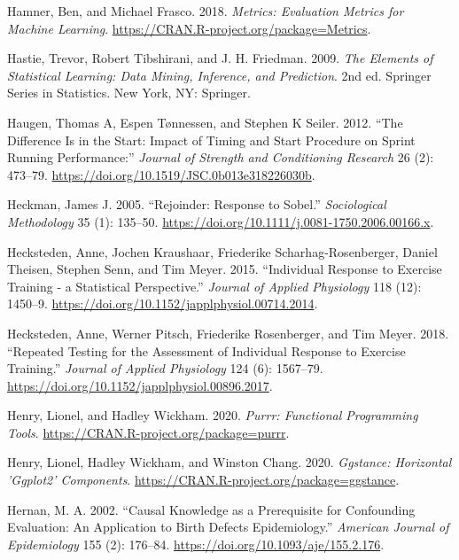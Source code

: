 \documentclass[
]{book}
\newlength{\cslhangindent}
\newenvironment{cslreferences}%
  {\setlength{\parindent}{0pt}%
  \everypar{\setlength{\hangindent}{\cslhangindent}}\ignorespaces}%
  {\par}
\begin{document}
\begin{cslreferences}
\leavevmode\hypertarget{ref-R-Metrics}{}%
Hamner, Ben, and Michael Frasco. 2018. \emph{Metrics: Evaluation Metrics for Machine Learning}. \url{https://CRAN.R-project.org/package=Metrics}.

\leavevmode\hypertarget{ref-hastieElementsStatisticalLearning2009}{}%
Hastie, Trevor, Robert Tibshirani, and J. H. Friedman. 2009. \emph{The Elements of Statistical Learning: Data Mining, Inference, and Prediction}. 2nd ed. Springer Series in Statistics. New York, NY: Springer.

\leavevmode\hypertarget{ref-haugenDifferenceStartImpact2012}{}%
Haugen, Thomas A, Espen Tønnessen, and Stephen K Seiler. 2012. ``The Difference Is in the Start: Impact of Timing and Start Procedure on Sprint Running Performance:'' \emph{Journal of Strength and Conditioning Research} 26 (2): 473--79. \url{https://doi.org/10.1519/JSC.0b013e318226030b}.

\leavevmode\hypertarget{ref-heckmanRejoinderResponseSobel2005}{}%
Heckman, James J. 2005. ``Rejoinder: Response to Sobel.'' \emph{Sociological Methodology} 35 (1): 135--50. \url{https://doi.org/10.1111/j.0081-1750.2006.00166.x}.

\leavevmode\hypertarget{ref-heckstedenIndividualResponseExercise2015}{}%
Hecksteden, Anne, Jochen Kraushaar, Friederike Scharhag-Rosenberger, Daniel Theisen, Stephen Senn, and Tim Meyer. 2015. ``Individual Response to Exercise Training - a Statistical Perspective.'' \emph{Journal of Applied Physiology} 118 (12): 1450--9. \url{https://doi.org/10.1152/japplphysiol.00714.2014}.

\leavevmode\hypertarget{ref-heckstedenRepeatedTestingAssessment2018}{}%
Hecksteden, Anne, Werner Pitsch, Friederike Rosenberger, and Tim Meyer. 2018. ``Repeated Testing for the Assessment of Individual Response to Exercise Training.'' \emph{Journal of Applied Physiology} 124 (6): 1567--79. \url{https://doi.org/10.1152/japplphysiol.00896.2017}.

\leavevmode\hypertarget{ref-R-purrr}{}%
Henry, Lionel, and Hadley Wickham. 2020. \emph{Purrr: Functional Programming Tools}. \url{https://CRAN.R-project.org/package=purrr}.

\leavevmode\hypertarget{ref-R-ggstance}{}%
Henry, Lionel, Hadley Wickham, and Winston Chang. 2020. \emph{Ggstance: Horizontal 'Ggplot2' Components}. \url{https://CRAN.R-project.org/package=ggstance}.

\leavevmode\hypertarget{ref-hernanCausalKnowledgePrerequisite2002}{}%
Hernan, M. A. 2002. ``Causal Knowledge as a Prerequisite for Confounding Evaluation: An Application to Birth Defects Epidemiology.'' \emph{American Journal of Epidemiology} 155 (2): 176--84. \url{https://doi.org/10.1093/aje/155.2.176}.


\end{cslreferences}
\end{document}
